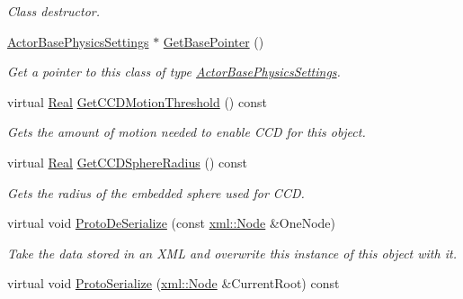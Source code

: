 \begin{DoxyCompactItemize}
\begin{DoxyCompactList}\small\item\em Class destructor. \item\end{DoxyCompactList}\item 
\hyperlink{classMezzanine_1_1ActorBasePhysicsSettings}{ActorBasePhysicsSettings} $\ast$ \hyperlink{classMezzanine_1_1ActorBasePhysicsSettings_ae43e2938e30b69ac11627b9648c43415}{GetBasePointer} ()
\begin{DoxyCompactList}\small\item\em Get a pointer to this class of type \hyperlink{classMezzanine_1_1ActorBasePhysicsSettings}{ActorBasePhysicsSettings}. \item\end{DoxyCompactList}\item 
virtual \hyperlink{namespaceMezzanine_a726731b1a7df72bf3583e4a97282c6f6}{Real} \hyperlink{classMezzanine_1_1ActorBasePhysicsSettings_a804941eb77d960dd3c73d331c47c891c}{GetCCDMotionThreshold} () const 
\begin{DoxyCompactList}\small\item\em Gets the amount of motion needed to enable CCD for this object. \item\end{DoxyCompactList}\item 
virtual \hyperlink{namespaceMezzanine_a726731b1a7df72bf3583e4a97282c6f6}{Real} \hyperlink{classMezzanine_1_1ActorBasePhysicsSettings_a3729e8ee88bc2d8892d921016aa4a4c0}{GetCCDSphereRadius} () const 
\begin{DoxyCompactList}\small\item\em Gets the radius of the embedded sphere used for CCD. \item\end{DoxyCompactList}\item 
virtual void \hyperlink{classMezzanine_1_1ActorBasePhysicsSettings_a8acd986f63a0c58ad6df9e4d3e291067}{ProtoDeSerialize} (const \hyperlink{classMezzanine_1_1xml_1_1Node}{xml::Node} \&OneNode)
\begin{DoxyCompactList}\small\item\em Take the data stored in an XML and overwrite this instance of this object with it. \item\end{DoxyCompactList}\item 
virtual void \hyperlink{classMezzanine_1_1ActorBasePhysicsSettings_ad3c4f8ac2df1c14f9cd498e1a60a34b2}{ProtoSerialize} (\hyperlink{classMezzanine_1_1xml_1_1Node}{xml::Node} \&CurrentRoot) const 

\end{DoxyCompactItemize}

